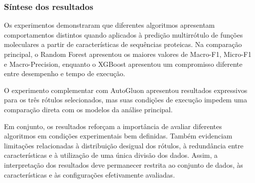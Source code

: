 \subsubsection{Síntese dos resultados}

Os experimentos demonstraram que diferentes algoritmos apresentam comportamentos distintos quando aplicados à predição multirrótulo de funções moleculares a partir de características de sequências proteicas. Na comparação principal, o Random Forest apresentou os maiores valores de Macro-F1, Micro-F1 e Macro-Precision, enquanto o XGBoost apresentou um compromisso diferente entre desempenho e tempo de execução.

O experimento complementar com AutoGluon apresentou resultados expressivos para os três rótulos selecionados, mas suas condições de execução impedem uma comparação direta com os modelos da análise principal.

Em conjunto, os resultados reforçam a importância de avaliar diferentes algoritmos em condições experimentais bem definidas. Também evidenciam limitações relacionadas à distribuição desigual dos rótulos, à redundância entre características e à utilização de uma única divisão dos dados. Assim, a interpretação dos resultados deve permanecer restrita ao conjunto de dados, às características e às configurações efetivamente avaliadas.